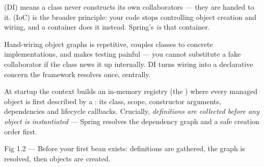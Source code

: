   (DI) means a class never constructs its own collaborators — they are handed to it.  (IoC) is the broader principle: your code stops controlling object creation and wiring, and a container does it instead. Spring's  \emph{is} that container.

 Hand-wiring object graphs is repetitive, couples classes to concrete implementations, and makes testing painful — you cannot substitute a fake collaborator if the class news it up internally. DI turns wiring into a declarative concern the framework resolves once, centrally.

 At startup the context builds an in-memory registry (the ) where every managed object is first described by a : its class, scope, constructor arguments, dependencies and lifecycle callbacks. Crucially, \emph{definitions are collected before any object is instantiated} — Spring resolves the dependency graph and a safe creation order first.

\begin{wbfigure}{Fig 1.2 — Before your first bean exists: definitions are gathered, the graph is resolved, then objects are created.}
\end{wbfigure}

